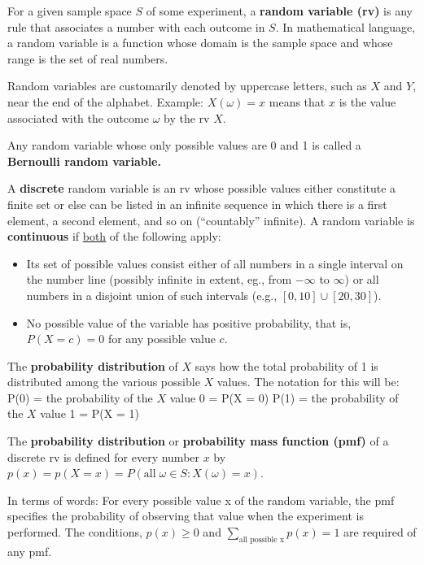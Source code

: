 \begin{definition}
    For a given sample space $S$ of some experiment, a \textbf{random variable (rv)} is any rule that associates a number with each outcome in $S$. In mathematical language, a random variable is a function whose domain is the sample space and whose range is the set of real numbers. 
\end{definition}

\begin{notation}
    Random variables are customarily denoted by uppercase letters, such as $X$ and $Y$, near the end of the alphabet. Example: $X(\omega) = x$ means that $x$ is the value associated with the outcome $\omega$ by the rv $X$.
\end{notation}

\begin{definition}
    Any random variable whose only possible values are 0 and 1 is called a \textbf{Bernoulli random variable.}
\end{definition}

\begin{definition}
    A \textbf{discrete} random variable is an rv whose possible values either constitute a finite set or else can be listed in an infinite sequence in which there is a first element, a second element, and so on (“countably” infinite). A random variable is \textbf{continuous} if \underline{both} of the following apply:
    \begin{itemize}
        \item Its set of possible values consist either of all numbers in a single interval on the number line (possibly infinite in extent, eg., from $-\infty$ to $\infty$) or all numbers in a disjoint union of such intervals (e.g., $[0, 10] \cup [20, 30]$).
        \item No possible value of the variable has positive probability, that is, $P(X = c) = 0$ for any possible value $c$.
    \end{itemize}
\end{definition}

\begin{notation}
    The \textbf{probability distribution} of $X$ says how the total probability of 1 is distributed among the various possible $X$ values. The notation for this will be: \newline
    P(0) = the probability of the $X$ value 0 = P(X = 0) \newline 
    P(1) = the probability of the $X$ value 1 = P(X = 1)
\end{notation}

\begin{definition}
    The \textbf{probability distribution} or \textbf{probability mass function (pmf)} of a discrete rv is defined for every number $x$ by $p(x) = p(X = x) = P(\text{all} \; \omega \in S: X(\omega) = x)$.
    
    In terms of words: For every possible value x of the random variable, the pmf specifies the probability of observing that value when the experiment is performed. The conditions, $p(x) \geq 0$ and $\sum_{\text{all possible x}}p(x) = 1$ are required of any pmf.
\end{definition}